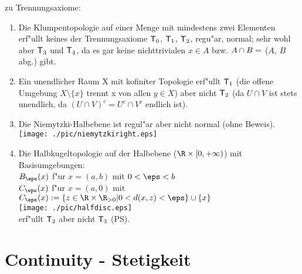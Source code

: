 \begin{beispiel}\label{3.18} zu Trennungsaxiome:
\begin{enumerate}
\item Die Klumpentopologie auf einer Menge mit mindestens zwei Elementen
    erf"ullt keines der Trennungsaxiome $\mbox{\sf T}_0$, $\mbox{\sf T}_1$,
    $\mbox{\sf T}_2$, regu"ar, normal; sehr wohl aber $\mbox{\sf T}_3$ und $\mbox{\sf T}_4$, da es gar
    keine nichttrivialen $x\in A$ bzw. $A\cap B =\empty$ ($A$, $B$ abg.) gibt.
\item Ein unendlicher Raum X mit kofiniter Topologie erf"ullt $\mbox{\sf T}_1$ (die offene Umgebung $X\setminus \{ x\}$ trennt x von allen $y\in X$) aber nicht $\mbox{\sf T}_2$ (da $U\cap V$ ist stets unendlich, da $(U\cap V)^c =U^c\cap V^c$ endlich ist).
\item Die {\sc Niemytzki}-Halbebene ist regul"ar aber nicht normal (ohne Beweis).
\texttt{[image: ./pic/niemytzkiright.eps]}
\item Die Halbkugeltopologie auf der Halbebene ($\R\times[0,+\infty )$) mit Basisumgebungen:\\
$B_\eps(x)$ f"ur $x =(a,b)$ mit $0<\eps < b$\\
$C_\eps(x)$ f"ur $x =(a,0)$ mit $C_\eps(x):=\{ z\in \R\times\R_{>0}| 0<d(x,z)<\eps\}\cup\{ x\}$\\
\texttt{[image: ./pic/halfdisc.eps]}\\
erf"ullt $\mbox{\sf T}_2$ aber nicht $\mbox{\sf T}_3$ (PS).
\end{enumerate}
\end{beispiel}
\newpage

\section{Continuity - Stetigkeit}

